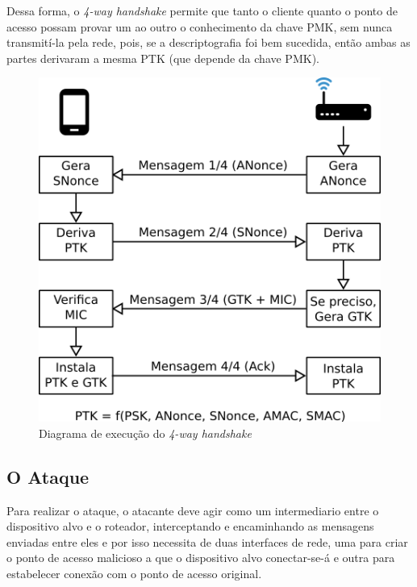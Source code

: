 \documentclass[12pt]{article}
\begin{document}
Dessa forma, o \textit{4-way handshake} permite que tanto o cliente quanto o ponto de acesso possam provar um ao outro o conhecimento da chave PMK, sem nunca transmití-la pela rede, pois, se a descriptografia foi bem sucedida, então ambas as partes derivaram a mesma PTK (que depende da chave PMK).
    

\begin{figure}[H]
	\begin{center}
    	\includegraphics[width=12cm]{Handshake.png}
    	\caption{Diagrama de execução do \textit{4-way handshake}}
    	\label{fig:handshake}
	\end{center}		
\end{figure}

\subsection{O Ataque}

Para realizar o ataque, o atacante deve agir como um intermediario entre o dispositivo alvo e o roteador,  interceptando e encaminhando as mensagens enviadas entre eles e por isso necessita de duas interfaces de rede, uma para criar o ponto de acesso malicioso a que o dispositivo alvo conectar-se-á e outra para estabelecer conexão com o ponto de acesso original.
\end{document}

